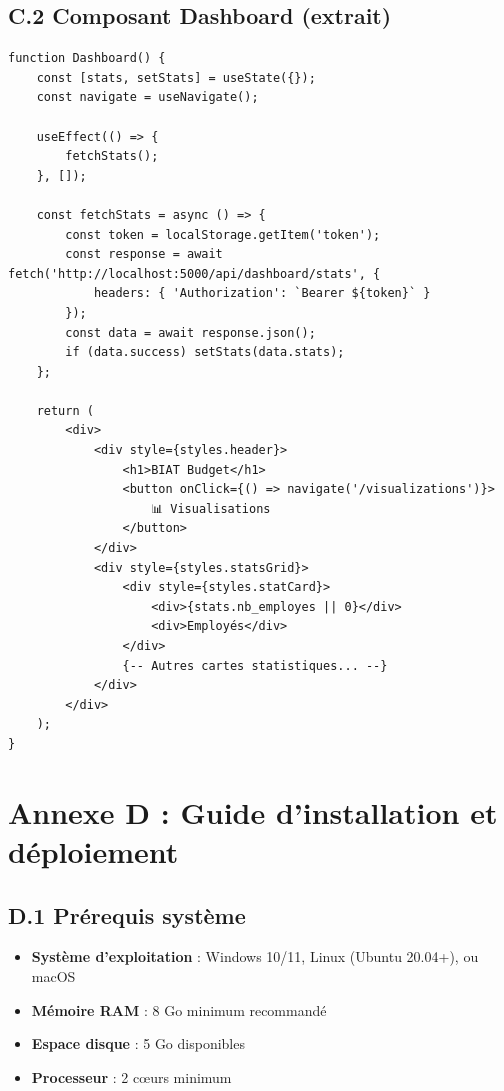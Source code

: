 \subsection*{C.2 Composant Dashboard (extrait)}

\begin{verbatim}
function Dashboard() {
    const [stats, setStats] = useState({});
    const navigate = useNavigate();

    useEffect(() => {
        fetchStats();
    }, []);

    const fetchStats = async () => {
        const token = localStorage.getItem('token');
        const response = await fetch('http://localhost:5000/api/dashboard/stats', {
            headers: { 'Authorization': `Bearer ${token}` }
        });
        const data = await response.json();
        if (data.success) setStats(data.stats);
    };

    return (
        <div>
            <div style={styles.header}>
                <h1>BIAT Budget</h1>
                <button onClick={() => navigate('/visualizations')}>
                    📊 Visualisations
                </button>
            </div>
            <div style={styles.statsGrid}>
                <div style={styles.statCard}>
                    <div>{stats.nb_employes || 0}</div>
                    <div>Employés</div>
                </div>
                {-- Autres cartes statistiques... --}
            </div>
        </div>
    );
}
\end{verbatim}

\newpage

\section*{Annexe D : Guide d'installation et déploiement}

\subsection*{D.1 Prérequis système}

\begin{itemize}
    \item \textbf{Système d'exploitation} : Windows 10/11, Linux (Ubuntu 20.04+), ou macOS
    \item \textbf{Mémoire RAM} : 8 Go minimum recommandé
    \item \textbf{Espace disque} : 5 Go disponibles
    \item \textbf{Processeur} : 2 cœurs minimum
\end{itemize}

